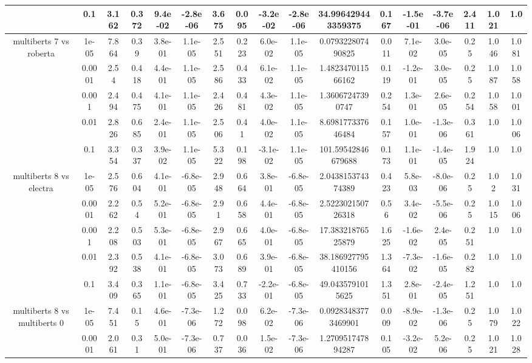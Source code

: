 \begin{tabular}{|c|c|c|c|c|c|c|c|c|c|c|c|c|c|c|c|c|}
 & 0.1 & 3.162 & 0.372 & 9.4e-02 & -2.8e-06 & 3.675 & 0.095 & -3.2e-02 & -2.8e-06 & 34.996429443359375 & 0.167 & -1.5e-01 & -3.7e-06 & 2.411 & 1.021 & 1.0 \\
\hline
\multirow{5}{*}{multiberts 7 vs roberta } & 1e-05 & 7.864 & 0.39 & 3.8e-01 & 1.1e-05 & 2.551 & 0.223 & 6.0e-02 & 1.1e-05 & 0.079322807490825 & 0.011 & 7.1e-02 & 3.0e-05 & 0.25 & 1.046 & 1.081 \\
 & 0.0001 & 2.54 & 0.418 & 4.4e-01 & 1.1e-05 & 2.586 & 0.433 & 6.1e-02 & 1.1e-05 & 1.482347011566162 & 0.119 & -1.2e-01 & 3.0e-05 & 0.25 & 1.087 & 1.058 \\
 & 0.001 & 2.494 & 0.475 & 4.1e-01 & 1.1e-05 & 2.426 & 0.481 & 4.3e-02 & 1.1e-05 & 1.36067247390747 & 0.254 & 1.3e-01 & 2.6e-05 & 0.254 & 1.058 & 1.001 \\
 & 0.01 & 2.826 & 0.685 & 2.4e-01 & 1.1e-05 & 2.506 & 0.41 & 4.0e-02 & 1.1e-05 & 8.698177337646484 & 0.157 & 1.0e-01 & -1.3e-06 & 0.361 & 1.0 & 1.006 \\
 & 0.1 & 3.354 & 0.337 & 3.9e-02 & 1.1e-05 & 5.322 & 0.198 & -3.1e-02 & 1.1e-05 & 101.59542846679688 & 0.173 & 1.1e-01 & -1.4e-05 & 1.924 & 1.0 & 1.0 \\
\hline
\multirow{5}{*}{multiberts 8 vs electra } & 1e-05 & 2.576 & 0.604 & 4.1e-01 & -6.8e-05 & 2.948 & 0.664 & 3.8e-01 & -6.8e-05 & 2.043815374374389 & 0.423 & 5.8e-03 & -8.0e-06 & 0.25 & 1.02 & 1.031 \\
 & 0.0001 & 2.262 & 0.54 & 5.2e-01 & -6.8e-05 & 2.91 & 0.658 & 4.4e-01 & -6.8e-05 & 2.522302150726318 & 0.56 & 3.4e-02 & -5.5e-06 & 0.25 & 1.015 & 1.006 \\
 & 0.001 & 2.208 & 0.503 & 5.3e-01 & -6.8e-05 & 2.967 & 0.665 & 4.0e-01 & -6.8e-05 & 17.38321876525879 & 1.625 & -1.6e-02 & 2.4e-05 & 0.251 & 1.0 & 1.0 \\
 & 0.01 & 2.392 & 0.538 & 4.1e-01 & -6.8e-05 & 3.073 & 0.689 & 3.9e-01 & -6.8e-05 & 38.186927795410156 & 1.364 & -7.3e-02 & -1.6e-05 & 0.282 & 1.0 & 1.0 \\
 & 0.1 & 3.409 & 0.365 & 1.1e-01 & -6.8e-05 & 3.425 & 0.733 & -2.2e-01 & -6.8e-05 & 49.0435791015625 & 1.351 & 2.8e-01 & -2.4e-05 & 1.251 & 1.0 & 1.0 \\
\hline
\multirow{5}{*}{multiberts 8 vs multiberts 0} & 1e-05 & 7.451 & 0.15 & 4.6e-01 & -7.3e-06 & 1.272 & 0.098 & 6.2e-02 & -7.3e-06 & 0.09283483773469901 & 0.009 & -8.9e-02 & -1.3e-06 & 0.25 & 1.079 & 1.022 \\
 & 0.0001 & 2.061 & 0.31 & 5.0e-01 & -7.3e-06 & 0.737 & 0.036 & 1.5e-02 & -7.3e-06 & 1.270951747894287 & 0.105 & -3.2e-02 & 5.2e-06 & 0.25 & 1.021 & 1.028 \\

\end{tabular}
